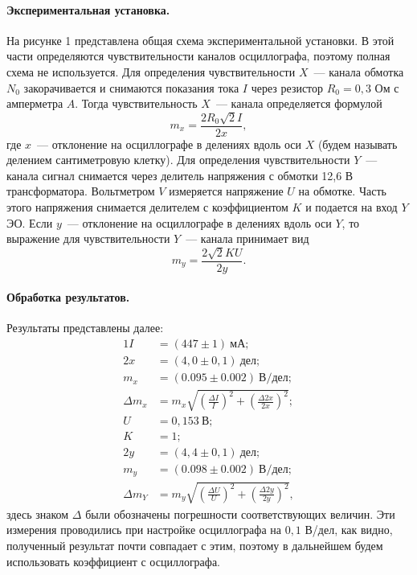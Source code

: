 \documentclass[12pt,a4paper]{article}
\begin{document}
\paragraph{Экспериментальная установка.} На рисунке 1 представлена общая схема экспериментальной установки. В этой части определяются чувствительности каналов осциллографа, поэтому полная схема не используется. Для определения чувствительности $X$~--- канала обмотка $N_0$ закорачивается и снимаются показания тока $I$ через резистор $R_0 = 0,3$ Ом с амперметра $A$. Тогда чувствительность $X$~--- канала определяется формулой
\begin{equation}
m_x = \frac{2R_0\sqrt{2}I}{2x},
\end{equation}
где $x$~--- отклонение на осциллографе в делениях вдоль оси $X$ (будем называть делением сантиметровую клетку). Для определения чувствительности $Y$~--- канала сигнал снимается через делитель напряжения с обмотки 12,6 В трансформатора. Вольтметром $V$ измеряется напряжение $U$ на обмотке. Часть этого напряжения снимается делителем с коэффициентом $K$ и подается на вход $Y$ ЭО. Если $y$~--- отклонение на осциллографе в делениях вдоль оси $Y$, то выражение для чувствительности $Y$~--- канала принимает вид
\begin{equation}
m_y = \frac{2\sqrt{2}KU}{2y}.
\end{equation}
\paragraph{Обработка результатов.} Результаты представлены далее:
\begin{alignat}{1}
I &= (447 \pm 1)~\text{мА};\\
2x &= (4,0 \pm 0,1)~\text{дел};\\
m_x &= (0.095 \pm 0.002)~\text{В/дел};\\
\Delta m_x &= m_x\sqrt{\left(\frac{\Delta I}{I}\right)^2 + \left(\frac{\Delta 2x}{2x}\right)^2};\\
U &= 0,153~\text{В};\\
K &= 1;\\
2y &= (4,4 \pm 0,1)~\text{дел};\\
m_y &= (0.098 \pm 0.002)~\text{В/дел};\\
\Delta m_Y &= m_y\sqrt{\left(\frac{\Delta U}{U}\right)^2 + \left(\frac{\Delta 2y}{2y}\right)^2},
\end{alignat}
здесь знаком $\Delta$ были обозначены погрешности соответствующих величин. Эти измерения проводились при настройке осциллографа на $0,1$ В/дел, как видно, полученный результат почти совпадает с этим, поэтому в дальнейшем будем использовать коэффициент с осциллографа.
\end{document}
